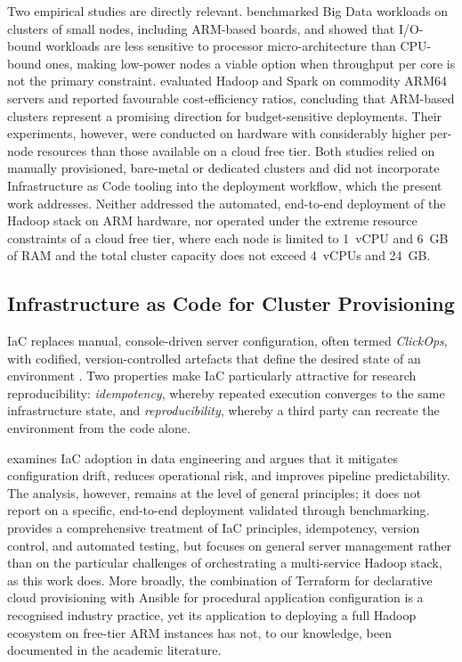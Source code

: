 Two empirical studies are directly relevant. \citet{loghin2015performance} benchmarked
Big Data workloads on clusters of small nodes, including ARM-based boards, and showed
that I/O-bound workloads are less sensitive to processor micro-architecture than
CPU-bound ones, making low-power nodes a viable option when throughput per core is not
the primary constraint. \citet{8287751} evaluated Hadoop and Spark on commodity ARM64
servers and reported favourable cost-efficiency ratios, concluding that ARM-based
clusters represent a promising direction for budget-sensitive deployments. Their
experiments, however, were conducted on hardware with considerably higher per-node
resources than those available on a cloud free tier. Both studies relied on manually
provisioned, bare-metal or dedicated clusters and did not incorporate Infrastructure
as Code tooling into the deployment workflow, which the present work addresses. Neither addressed
the automated, end-to-end deployment of the Hadoop stack on ARM hardware, nor operated under the
extreme resource constraints of a cloud free tier, where each node is limited to
1~vCPU and 6~GB of RAM and the total cluster capacity does not exceed 4~vCPUs and
24~GB.

\subsection{Infrastructure as Code for Cluster Provisioning}

IaC replaces manual, console-driven server configuration,
often termed \emph{ClickOps}, with codified, version-controlled artefacts that
define the desired state of an environment \citep{morris2016infrastructure}. Two
properties make IaC particularly attractive for research reproducibility:
\emph{idempotency}, whereby repeated execution converges to the same infrastructure
state, and \emph{reproducibility}, whereby a third party can recreate the environment
from the code alone.

\citet{Bollineni2022IaCDataEngineering} examines IaC adoption in data
engineering and argues that it mitigates configuration drift, reduces operational risk,
and improves pipeline predictability. The analysis, however, remains at the level of
general principles; it does not report on a specific, end-to-end deployment validated
through benchmarking. \citet{morris2016infrastructure} provides a comprehensive
treatment of IaC principles, idempotency, version control, and automated
testing, but focuses on general server management rather than on the particular
challenges of orchestrating a multi-service Hadoop stack, as this work does. More broadly, 
the combination of Terraform for declarative cloud provisioning with Ansible for procedural 
application configuration is a recognised industry practice, yet its application to deploying a
full Hadoop ecosystem on free-tier ARM instances has not, to our knowledge, been
documented in the academic literature.

